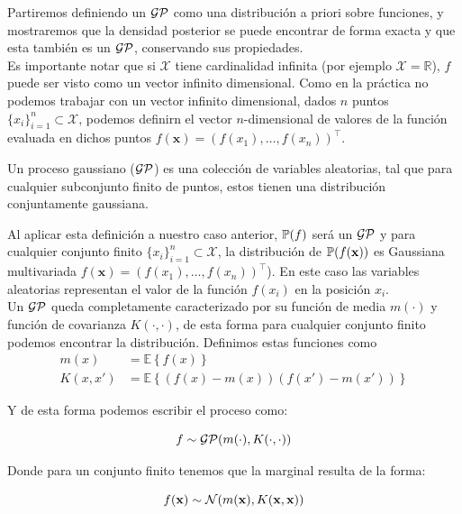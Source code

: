 Partiremos definiendo un $\mathcal{GP}$ como una distribución a priori sobre funciones, y mostraremos que la densidad posterior se puede encontrar de forma exacta y que esta también es un $\mathcal{GP}$, conservando sus propiedades.\\

Es importante notar que si $\mathcal{X}$ tiene cardinalidad infinita (por ejemplo $\mathcal{X}=\mathbb{R}$), $f$ puede ser visto como un vector infinito dimensional. Como en la práctica no podemos trabajar con un vector infinito dimensional, dados $n$ puntos $\{ x_i\}_{i=1}^{n}  \subset \mathcal{X}$, podemos definirn el vector $n$-dimensional de valores de la función evaluada en dichos puntos $f(\mathbf{x})=(f(x_1), \ldots, f(x_n))^\top$.

\begin{definition}
	Un proceso gaussiano ($\mathcal{GP}$) es una colección de variables aleatorias, tal que para cualquier subconjunto finito de puntos, estos tienen una distribución conjuntamente gaussiana.
\end{definition}

Al aplicar esta definición a nuestro caso anterior, $\mathbb{P}(f)$ será un $\mathcal{GP}$ y para cualquier conjunto finito $\{ x_i\}_{i=1}^{n}  \subset \mathcal{X}$, la distribución de $\mathbb{P}(f(\mathbf{x}))$ es Gaussiana multivariada $f(\mathbf{x})=(f(x_1), \ldots, f(x_n))^\top$). En este caso las variables aleatorias representan el valor de la función $f(x_i)$ en la posición $x_i$.\\

Un $\mathcal{GP}$ queda completamente caracterizado por su función de media $m(\cdot)$ y función de covarianza $K(\cdot, \cdot)$, de esta forma para cualquier conjunto finito podemos encontrar la distribución. Definimos estas funciones como
\begin{align}
	m(x) & = \mathbb{E}\left\{f(x)\right\}\\
	K(x, x') & = \mathbb{E}\left\{\left(f(x) - m(x)\right) \left(f(x') - m(x') \right)\right\}
\end{align}

Y de esta forma podemos escribir el proceso como:

\begin{equation}
	f \sim \mathcal{GP}(m(\cdot), K(\cdot, \cdot))
\end{equation}

Donde para un conjunto finito tenemos que la marginal resulta de la forma:

\begin{equation}
	f(\mathbf{x}) \sim \mathcal{N}(m(\mathbf{x}), K(\mathbf{x}, \mathbf{x}))
\end{equation}

